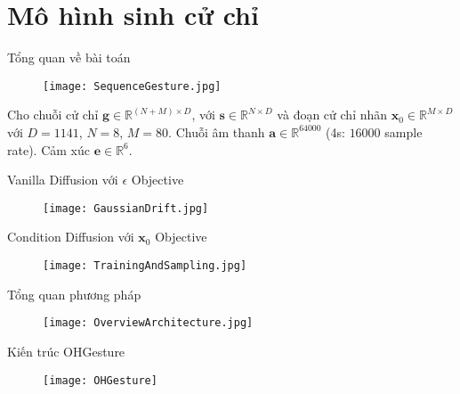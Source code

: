 
\section{Mô hình sinh cử chỉ}

\begin{frame}{Tổng quan về bài toán}
	\begin{figure}
		\centering
		\texttt{[image: SequenceGesture.jpg]}
	\end{figure}
	
	Cho chuỗi cử chỉ $\mathbf{g} \in \mathbb{R}^{(N+ M) \times D}$, với $\mathbf{s} \in \mathbb{R}^{N \times D}$ và đoạn cử chỉ nhãn $\mathbf{x}_0 \in \mathbb{R}^{M \times D}$ với $D=1141$, $N=8$, $M=80$. Chuỗi âm thanh $\mathbf{a} \in \mathbb{R}^{64000}$ (4s: $16000$ sample rate). Cảm xúc $\mathbf{e} \in \mathbb{R}^6$. 

\end{frame}

\begin{frame}{Vanilla Diffusion với $\epsilon$ Objective}
	\begin{figure}
		\centering
		\texttt{[image: GaussianDrift.jpg]}
	\end{figure}
\end{frame}

\begin{frame}{Condition Diffusion với $\mathbf{x}_0$ Objective}
	\begin{figure}
		\centering
		\texttt{[image: TrainingAndSampling.jpg]}
	\end{figure}
\end{frame}

\begin{frame}{Tổng quan phương pháp}
	
	\begin{figure}
		\centering
		\texttt{[image: OverviewArchitecture.jpg]}
	\end{figure}
	
\end{frame}

\begin{frame}{Kiến trúc OHGesture}
	\begin{figure}
		\centering
		\texttt{[image: OHGesture]}
	\end{figure}
\end{frame}


